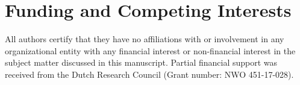 \documentclass[12pt, a4paper, leqno]{article}
\begin{document}
\begin{titlepage}
\begin{abstract}
\vspace{0.5cm}
\noindent
\textbf{Keywords:} playlist followers, music streaming platforms, playlist featuring, major record labels, causal inference\\
\vspace{0in}\\



\bigskip
\end{abstract}
\setcounter{page}{1}
\end{titlepage}
\newpage

{}

\setcounter{page}{2}





%


 


\section*{Funding and Competing Interests} 
All authors certify that they have no affiliations with or involvement in any organizational entity with any financial interest or non-financial interest in the subject matter discussed in this manuscript. Partial financial support was received from the Dutch Research Council (Grant number: NWO 451-17-028).


\clearpage


\newpage
\appendix


\end{document}
